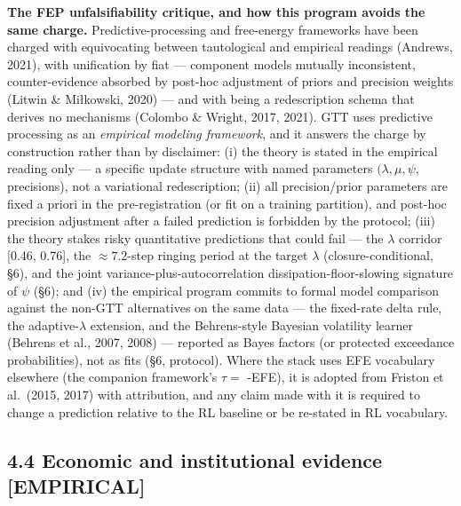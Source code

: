 \documentclass[
]{article}
\begin{document}
\textbf{The FEP unfalsifiability critique, and how this program avoids
the same charge.} Predictive-processing and free-energy frameworks have
been charged with equivocating between tautological and empirical
readings (Andrews, 2021), with unification by fiat --- component models
mutually inconsistent, counter-evidence absorbed by post-hoc adjustment
of priors and precision weights (Litwin \& Miłkowski, 2020) --- and with
being a redescription schema that derives no mechanisms (Colombo \&
Wright, 2017, 2021). GTT uses predictive processing as an
\emph{empirical modeling framework}, and it answers the charge by
construction rather than by disclaimer: (i) the theory is stated in the
empirical reading only --- a specific update structure with named
parameters \((\lambda, \mu, \psi,\) precisions), not a variational
redescription; (ii) all precision/prior parameters are fixed a priori in
the pre-registration (or fit on a training partition), and post-hoc
precision adjustment after a failed prediction is forbidden by the
protocol; (iii) the theory stakes risky quantitative predictions that
could fail --- the \(\lambda\) corridor {[}0.46, 0.76{]}, the
\(\approx7.2\)-step ringing period at the target \(\lambda\)
(closure-conditional, §6), and the joint variance-plus-autocorrelation
dissipation-floor-slowing signature of \(\psi\) (§6); and (iv) the
empirical program commits to formal model comparison against the non-GTT
alternatives on the same data --- the fixed-rate delta rule, the
adaptive-\(\lambda\) extension, and the Behrens-style Bayesian
volatility learner (Behrens et al., 2007, 2008) --- reported as Bayes
factors (or protected exceedance probabilities), not as fits (§6,
protocol). Where the stack uses EFE vocabulary elsewhere (the companion
framework's \(\tau =\) -EFE), it is adopted from Friston et al.~(2015,
2017) with attribution, and any claim made with it is required to change
a prediction relative to the RL baseline or be re-stated in RL
vocabulary.

\subsection{4.4 Economic and institutional evidence
{[}EMPIRICAL{]}}\label{economic-and-institutional-evidence-empirical}
\end{document}
